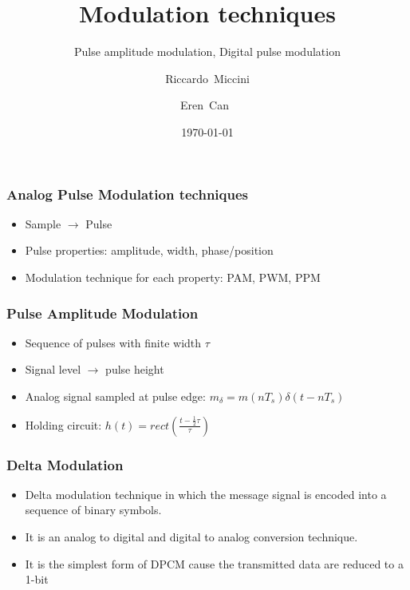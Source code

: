 \documentclass{beamer}
\title{Modulation techniques}
\subtitle{Pulse amplitude modulation, Digital pulse modulation}
\author[Riccardo \and Eren]{Riccardo~Miccini\inst{1} \and Eren~Can~\inst{1}}
\institute[DTU]
{
	\inst{1}
	Technical University of Denmark\\
	Digital Communication
}
\date{\today}
\begin{document}
	\frame{\titlepage}

	\begin{frame}
		\frametitle{Analog Pulse Modulation techniques}
		\begin{itemize}
			\item Sample $ \rightarrow $ Pulse
			\item Pulse properties: amplitude, width, phase/position
			\item Modulation technique for each property: PAM, PWM, PPM
		\end{itemize}
	\end{frame}

	\begin{frame}
		\frametitle{Pulse Amplitude Modulation}
		\begin{itemize}
			\item Sequence of pulses with finite width $ \tau $
			\item Signal level $ \rightarrow $ pulse height
			\item Analog signal sampled at pulse edge: $ m_\delta = m(nT_s)\delta(t - nT_s) $
			\item Holding circuit: $ h(t) = rect(\frac{t - \frac{1}{2}\tau}{\tau}) $
		\end{itemize}
	\end{frame}

	\begin{frame}
		\frametitle{Delta Modulation}
		\begin{itemize}
			\item Delta modulation technique in which the message signal is encoded into a sequence of binary symbols.
			\item It is an analog to digital and digital to analog conversion technique.
			\item  It is the simplest form of DPCM cause the transmitted data are reduced to  a 1-bit
		\end{itemize}
	\end{frame}
\end{document}
